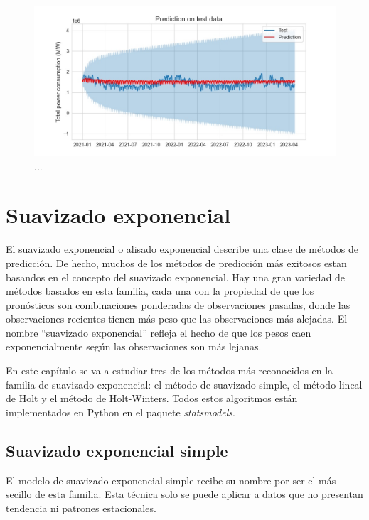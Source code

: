 \documentclass[12pt,twoside]{article}
\begin{document}
\begin{center}
\begin{figure}[h]
    \includegraphics[width = \textwidth]{imagenes/SARIMA_pred.jpg}
    \caption{...}\label{fig:SARIMA_pred}
\end{figure}
\end{center}






\newpage
\section{Suavizado exponencial}

El suavizado exponencial o alisado exponencial describe una clase de métodos de predicción. De hecho, muchos de los métodos de predicción más exitosos estan basandos en el concepto del suavizado exponencial. Hay una gran variedad de métodos basados en esta familia, cada una con la propiedad de que los pronósticos son combinaciones ponderadas de observaciones pasadas, donde las observaciones recientes tienen  más peso que las observaciones más alejadas. El nombre ``suavizado exponencial'' refleja el hecho de que los pesos caen exponencialmente según las observaciones son más lejanas.

En este capítulo se va a estudiar tres de los métodos más reconocidos en la familia de suavizado exponencial: el método de suavizado simple, el método lineal de Holt y el método de Holt-Winters. Todos estos algoritmos están implementados en Python en el paquete \emph{statsmodels}.




\subsection{Suavizado exponencial simple}
El modelo de suavizado exponencial simple recibe su nombre por ser el más secillo de esta familia. Esta técnica solo se puede aplicar a datos que no presentan tendencia ni patrones estacionales. 
\end{document}
